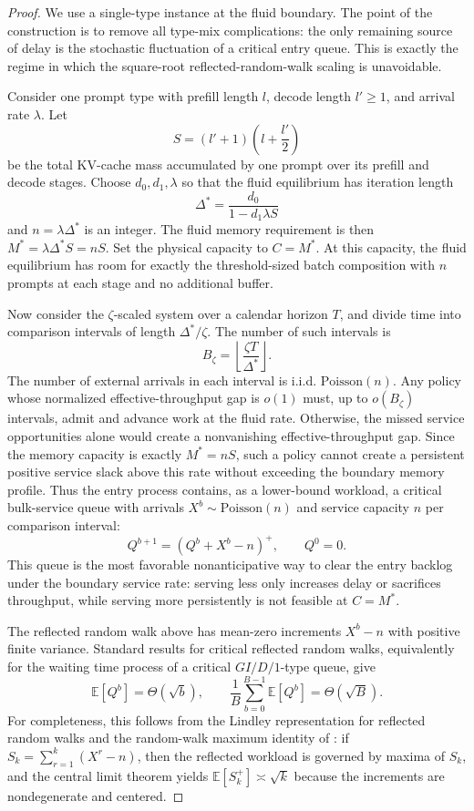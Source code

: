 \begin{proof}
We use a single-type instance at the fluid boundary. The point of the construction is to remove all type-mix complications: the only remaining source of delay is the stochastic fluctuation of a critical entry queue. This is exactly the regime in which the square-root reflected-random-walk scaling is unavoidable.

Consider one prompt type with prefill length \(l\), decode length \(l'\ge1\), and arrival rate \(\lambda\). Let
\[
    S=(l'+1)\left(l+\frac{l'}{2}\right)
\]
be the total KV-cache mass accumulated by one prompt over its prefill and decode stages. Choose \(d_0,d_1,\lambda\) so that the fluid equilibrium has iteration length
\[
    \Delta^*=\frac{d_0}{1-d_1\lambda S}
\]
and \(n=\lambda\Delta^*\) is an integer. The fluid memory requirement is then \(M^*=\lambda\Delta^*S=nS\). Set the physical capacity to \(C=M^*\). At this capacity, the fluid equilibrium has room for exactly the threshold-sized batch composition with \(n\) prompts at each stage and no additional buffer.

Now consider the \(\zeta\)-scaled system over a calendar horizon \(T\), and divide time into comparison intervals of length \(\Delta^*/\zeta\). The number of such intervals is
\[
    B_\zeta=\left\lfloor\frac{\zeta T}{\Delta^*}\right\rfloor.
\]
The number of external arrivals in each interval is i.i.d. \(\mathrm{Poisson}(n)\). Any policy whose normalized effective-throughput gap is \(o(1)\) must, up to \(o(B_\zeta)\) intervals, admit and advance work at the fluid rate. Otherwise, the missed service opportunities alone would create a nonvanishing effective-throughput gap. Since the memory capacity is exactly \(M^*=nS\), such a policy cannot create a persistent positive service slack above this rate without exceeding the boundary memory profile. Thus the entry process contains, as a lower-bound workload, a critical bulk-service queue with arrivals \(X^b\sim\mathrm{Poisson}(n)\) and service capacity \(n\) per comparison interval:
\[
    Q^{b+1}=(Q^b+X^b-n)^+,\qquad Q^0=0.
\]
This queue is the most favorable nonanticipative way to clear the entry backlog under the boundary service rate: serving less only increases delay or sacrifices throughput, while serving more persistently is not feasible at \(C=M^*\).

The reflected random walk above has mean-zero increments \(X^b-n\) with positive finite variance. Standard results for critical reflected random walks, equivalently for the waiting time process of a critical \(GI/D/1\)-type queue, give
\[
    \mathbb{E}[Q^b]=\Theta(\sqrt{b}),
    \qquad
    \frac{1}{B}\sum_{b=0}^{B-1}\mathbb{E}[Q^b]=\Theta(\sqrt{B}).
\]
For completeness, this follows from the Lindley representation for reflected random walks \citep[Proposition~6.3]{asmussen2003applied} and the random-walk maximum identity of \citet{strait1974maximum}: if \(S_k=\sum_{r=1}^k(X^r-n)\), then the reflected workload is governed by maxima of \(S_k\), and the central limit theorem yields \(\mathbb{E}[S_k^+]\asymp\sqrt{k}\) because the increments are nondegenerate and centered.


\end{proof}
